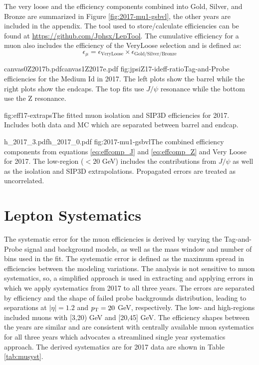The very loose and the efficiency components combined into Gold, Silver, and Bronze are summarized in Figure \ref{fig:2017-mu1-gsbvl}, the other years are included in the appendix. The tool used to store/calculate efficiencies can be found at \url{https://github.com/Jphsx/LepTool}.  The cumulative efficiency for a muon also includes the efficiency of the VeryLoose selection and is defined as:
\begin{equation}
\epsilon_\mu = \epsilon_{\text{VeryLoose}} \times \epsilon_{\text{Gold/Silver/Bronze}}
\end{equation}



%
           {canvas0Z2017b.pdf}{canvas1Z2017e.pdf}%
          {fig:jpsiZ17-ideff-ratio}{Tag-and-Probe efficiencies for the Medium Id in 2017. The left plots show the barrel while the right plots show the endcaps. The top fits use $J/\psi$ resonance while the bottom use the Z resonance. }

%
          {fig:eff17-extraps}{The fitted muon isolation and SIP3D efficiencies for 2017. Includes both data and MC which are separated between barrel and endcap.  }



		   {h_2017_3.pdf}{h_2017_0.pdf}
		   {fig:2017-mu1-gsbvl}{The combined efficiency components from equations \ref{eq:effcomp_J} and \ref{eq:effcomp_Z} and Very Loose for 2017. The low-\pt region ($<20$ GeV) includes the contributions from $J/\psi$ as well as the isolation and SIP3D extrapolations. Propagated errors are treated as uncorrelated.}


\section{Lepton Systematics}

The systematic error for the muon efficiencies is derived by varying the Tag-and-Probe signal and background models, as well as the mass window and number of bins used in the fit. The systematic error is defined as the maximum spread in efficiencies between the modeling variations. The analysis is not sensitive to muon systematics, so, a simplified approach is used in extracting and applying errors in which we apply systematics from 2017 to all three years. The errors are separated by efficiency and the shape of failed probe backgrounds distribution, leading to separations at $|\eta|=1.2$ and $p_{\mathrm{T}}=20$ GeV, respectively. The low- and high-\pt regions included muons with [3,20) GeV and [20,45] GeV. The efficiency shapes between the years are similar and are consistent with centrally available muon systematics for all three years which advocates a streamlined single year systematics approach. The derived systematics are for 2017 data are shown in Table \ref{tab:musyst}.
